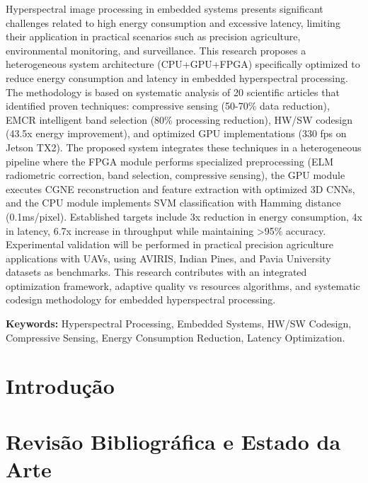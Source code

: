\documentclass[12pt,oneside,a4paper,english,brazilian]{report}
\begin{document}
Hyperspectral image processing in embedded systems presents significant challenges related to high energy consumption and excessive latency, limiting their application in practical scenarios such as precision agriculture, environmental monitoring, and surveillance. This research proposes a heterogeneous system architecture (CPU+GPU+FPGA) specifically optimized to reduce energy consumption and latency in embedded hyperspectral processing. The methodology is based on systematic analysis of 20 scientific articles that identified proven techniques: compressive sensing (50-70\% data reduction), EMCR intelligent band selection (80\% processing reduction), HW/SW codesign (43.5x energy improvement), and optimized GPU implementations (330 fps on Jetson TX2). The proposed system integrates these techniques in a heterogeneous pipeline where the FPGA module performs specialized preprocessing (ELM radiometric correction, band selection, compressive sensing), the GPU module executes CGNE reconstruction and feature extraction with optimized 3D CNNs, and the CPU module implements SVM classification with Hamming distance (0.1ms/pixel). Established targets include 3x reduction in energy consumption, 4x in latency, 6.7x increase in throughput while maintaining >95\% accuracy. Experimental validation will be performed in practical precision agriculture applications with UAVs, using AVIRIS, Indian Pines, and Pavia University datasets as benchmarks. This research contributes with an integrated optimization framework, adaptive quality vs resources algorithms, and systematic codesign methodology for embedded hyperspectral processing.

\textbf{Keywords:} Hyperspectral Processing, Embedded Systems, HW/SW Codesign, Compressive Sensing, Energy Consumption Reduction, Latency Optimization.

\newpage
\tableofcontents

\newpage
\listoffigures

\newpage
\listoftables

\newpage


\newpage
\chapter{Introdução}


\newpage
\chapter{Revisão Bibliográfica e Estado da Arte}

\end{document}
